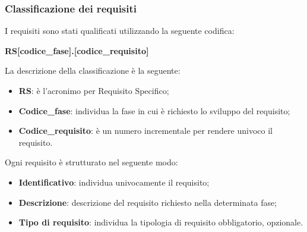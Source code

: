 \subsubsection{Classificazione dei requisiti}\label{2.2.3.6}%
I requisiti sono stati qualificati utilizzando la seguente codifica:
\begin{center}
	\textbf{RS[codice\_fase].[codice\_requisito]}
\end{center} 
La descrizione della classificazione è la seguente:
\begin{itemize}
	\item \textbf{RS}: è l'acronimo per Requisito Specifico;
	\item \textbf{Codice\_fase}: individua la fase in cui è richiesto lo sviluppo del requisito;
	\item \textbf{Codice\_requisito}: è un numero incrementale per rendere univoco il requisito.
\end{itemize}
Ogni requisito è strutturato nel seguente modo:
\begin{itemize}
	\item \textbf{Identificativo}: individua univocamente il requisito;
	\item \textbf{Descrizione}: descrizione del requisito richiesto nella determinata fase;
	\item \textbf{Tipo di requisito}: individua la tipologia di requisito obbligatorio, opzionale.
\end{itemize}
